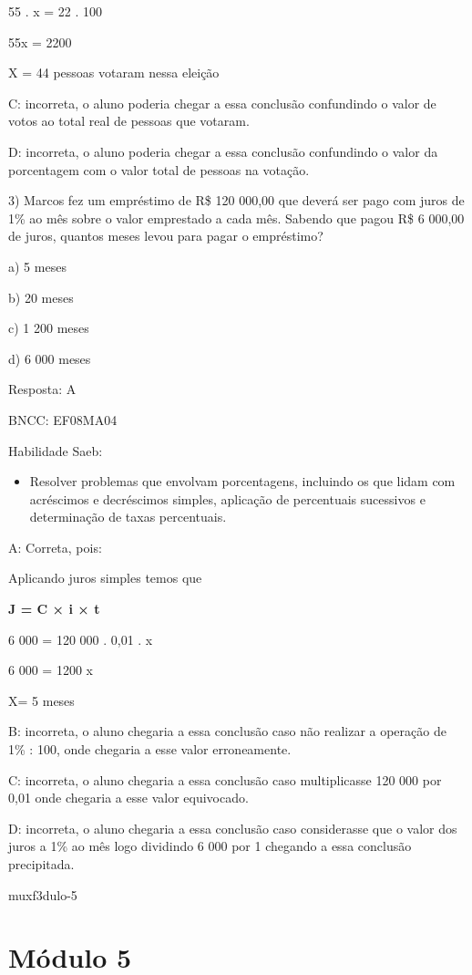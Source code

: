 {55 . x = 22 . 100

55x = 2200

X = 44 pessoas votaram nessa eleição

C: incorreta, o aluno poderia chegar a essa conclusão confundindo o
valor de votos ao total real de pessoas que votaram.

D: incorreta, o aluno poderia chegar a essa conclusão confundindo o
valor da porcentagem com o valor total de pessoas na votação.

3) Marcos fez um empréstimo de R\$ 120 000,00 que deverá ser pago com
juros de 1\% ao mês sobre o valor emprestado a cada mês. Sabendo que
pagou R\$ 6 000,00 de juros, quantos meses levou para pagar o
empréstimo?

a) 5 meses

b) 20 meses

c) 1 200 meses

d) 6 000 meses

Resposta: A

BNCC: EF08MA04

Habilidade Saeb:

\begin{itemize}
\tightlist
\item
  Resolver problemas que envolvam porcentagens, incluindo os que lidam
  com acréscimos e decréscimos simples, aplicação de percentuais
  sucessivos e determinação de taxas percentuais.
\end{itemize}

A: Correta, pois:

Aplicando juros simples temos que

\textbf{J = C × i × t}

6 000 = 120 000 . 0,01 . x

6 000 = 1200 x

X= 5 meses

B: incorreta, o aluno chegaria a essa conclusão caso não realizar a
operação de 1\% : 100, onde chegaria a esse valor erroneamente.

C: incorreta, o aluno chegaria a essa conclusão caso multiplicasse 120
000 por 0,01 onde chegaria a esse valor equivocado.

D: incorreta, o aluno chegaria a essa conclusão caso considerasse que o
valor dos juros a 1\% ao mês logo dividindo 6 000 por 1 chegando a essa
conclusão precipitada.

muxf3dulo-5}{%
\section{Módulo 5}

}
